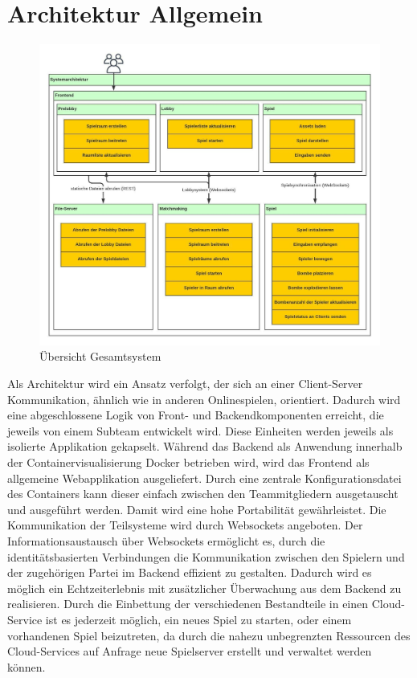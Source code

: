 \documentclass[conference]{IEEEtran}
\begin{document}
\section{Architektur Allgemein}
\begin{figure}
    \centering
    \includegraphics[width=\textwidth]{architecture.jpeg}
    \caption{Übersicht Gesamtsystem}
\end{figure}

Als Architektur wird ein Ansatz verfolgt, der sich an einer Client-Server Kommunikation, ähnlich wie in anderen Onlinespielen, orientiert.
Dadurch wird eine abgeschlossene Logik von Front- und Backendkomponenten erreicht, die jeweils
von einem Subteam entwickelt wird. Diese Einheiten werden jeweils als isolierte Applikation gekapselt. Während das Backend als Anwendung innerhalb der Containervisualisierung Docker\cite{docker} betrieben wird, wird das Frontend als allgemeine Webapplikation ausgeliefert. Durch eine zentrale Konfigurationsdatei des Containers kann dieser einfach zwischen den Teammitgliedern ausgetauscht und ausgeführt werden. Damit wird eine hohe Portabilität gewährleistet.
Die Kommunikation der Teilsysteme wird durch Websockets\cite{socketio} angeboten. Der Informationsaustausch über Websockets ermöglicht es, durch die identitätsbasierten Verbindungen die Kommunikation zwischen den Spielern und der zugehörigen Partei im Backend effizient zu gestalten.
Dadurch wird es möglich ein Echtzeiterlebnis mit zusätzlicher Überwachung aus dem Backend zu realisieren.
Durch die Einbettung der verschiedenen Bestandteile in einen Cloud-Service ist es jederzeit möglich, ein neues Spiel zu starten, oder einem vorhandenen Spiel beizutreten, da durch die nahezu unbegrenzten Ressourcen des Cloud-Services auf Anfrage neue Spielserver erstellt und verwaltet werden können.
\end{document}
